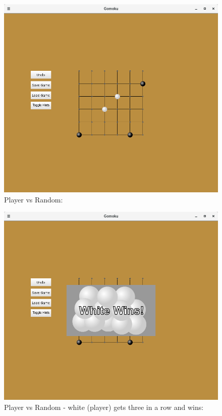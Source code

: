 \documentclass[11]{article}
\begin{document}
\begin{figure}[h]
					\caption{Player vs Random:}				\centering
					\includegraphics[scale=0.5]{Random3.png}
\end{figure}

\begin{figure}[h]
					\caption{Player vs Random - white (player) gets three in a row and wins:}				\centering
					\includegraphics[scale=0.5]{Random4.png}
\end{figure}
\end{document}
